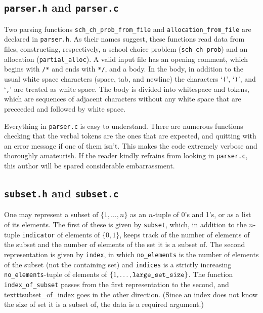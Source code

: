 \documentclass[12pt]{article}
\theoremstyle{definition}
\begin{document}
\begin{appendix}
\subsection{\texttt{parser.h} and \texttt{parser.c}}

Two parsing functions \texttt{sch\_ch\_prob\_from\_file} and
\texttt{allocation\_from\_file} are declared in \texttt{parser.h}.  As
their names suggest, these functions read data from files,
constructing, respectively, a school choice problem
(\texttt{sch\_ch\_prob}) and an allocation (\texttt{partial\_alloc}).
A valid input file has an opening comment, which begins with
\texttt{/*} and ends with \texttt{*/}, and a body.  In the body, in
addition to the usual white space characters (space, tab, and newline)
the characters `\texttt{(}', `\texttt{)}', and `\texttt{,}' are
treated as white space.  The body is divided into whitespace and
tokens, which are sequences of adjacent characters without any white
space that are preceeded and followed by white space.

Everything in \texttt{parser.c} is easy to understand.  There are
numerous functions checking that the verbal tokens are the ones that
are expected, and quitting with an error message if one of them
isn't. This makes the code extremely verbose and thoroughly
amateurish.  If the reader kindly refrains from looking in
\texttt{parser.c}, this author will be spared considerable
embarrassment.

\subsection{\texttt{subset.h} and \texttt{subset.c}}

One may represent a subset of $\{1, \ldots, n\}$ as an $n$-tuple of
0's and 1's, or as a list of its elements.  The first of these is
given by \texttt{subset}, which, in addition to the $n$-tuple
\texttt{indicator} of elements of $\{0,1\}$, keeps track of the number
of elements of the subset and the number of elements of the set it is
a subset of.  The second representation is given by \texttt{index}, in
which \texttt{no\_elements} is the number of elements of the subset
(not the containing set) and \texttt{indices} is a strictly increasing
\texttt{no\_elements}-tuple of elements of $\{1, \ldots,
\text{\texttt{large\_set\_size}}\}$.  The function
\texttt{index\_of\_subset} passes from the first representation to the
second, and texttt{subset\_of\_index} goes in the other direction.
(Since an index does not know the size of set it is a subset of, the
data is a required argument.)


\end{appendix}
\end{document}
